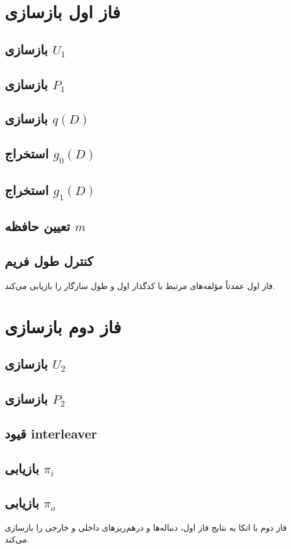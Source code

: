 \section{فاز اول بازسازی}
\subsection{بازسازی \(U_1\)}
\subsection{بازسازی \(P_1\)}
\subsection{بازسازی \(q(D)\)}
\subsection{استخراج \(g_0(D)\)}
\subsection{استخراج \(g_1(D)\)}
\subsection{تعیین حافظه \(m\)}
\subsection{کنترل طول فریم}
فاز اول عمدتاً مؤلفه‌های مرتبط با کدگذار اول و طول سازگار را بازیابی می‌کند.

\section{فاز دوم بازسازی}
\subsection{بازسازی \(U_2\)}
\subsection{بازسازی \(P_2\)}
\subsection{قیود interleaver}
\subsection{بازیابی \(\pi_i\)}
\subsection{بازیابی \(\pi_o\)}
فاز دوم با اتکا به نتایج فاز اول، دنباله‌ها و درهم‌ریزهای داخلی و خارجی را بازسازی می‌کند.

